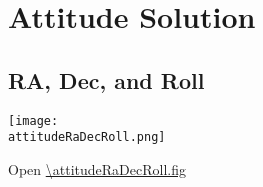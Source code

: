 %
% 
% 
%
%
\section{Attitude Solution}

\subsection{RA, Dec, and Roll}

\begin{center}
  \texttt{[image: \\attitudeRaDecRoll.png]}
\end{center}
Open \url{\attitudeRaDecRoll.fig}

